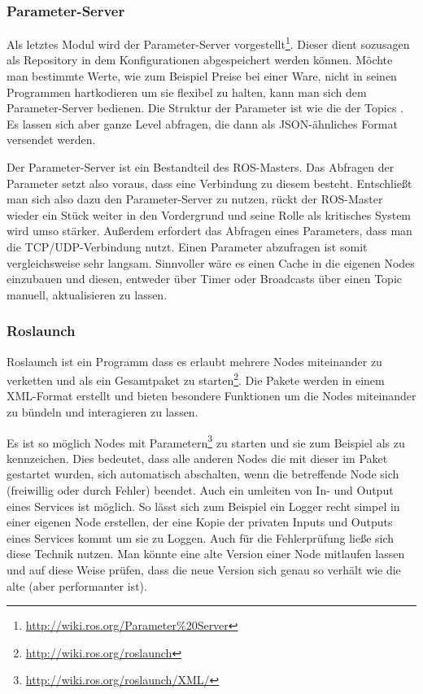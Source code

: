 \subsubsection*{Parameter-Server}
Als letztes Modul wird der Parameter-Server vorgestellt\footnote{\url{http://wiki.ros.org/Parameter\%20Server}}. Dieser dient sozusagen als Repository in dem Konfigurationen abgespeichert werden können. Möchte man bestimmte Werte, wie zum Beispiel Preise bei einer Ware, nicht in seinen Programmen hartkodieren um sie flexibel zu halten, kann man sich dem Parameter-Server bedienen. Die Struktur der Parameter ist wie die der Topics . Es lassen sich aber ganze Level abfragen, die dann als JSON-ähnliches Format versendet werden.

Der Parameter-Server ist ein Bestandteil des ROS-Masters. Das Abfragen der Parameter setzt also voraus, dass eine Verbindung zu diesem besteht. Entschließt man sich also dazu den Parameter-Server zu nutzen, rückt der ROS-Master wieder ein Stück weiter in den Vordergrund und seine Rolle als kritisches System wird umso stärker. Außerdem erfordert das Abfragen eines Parameters, dass man die TCP/UDP-Verbindung nutzt. Einen Parameter abzufragen ist somit vergleichsweise sehr langsam. Sinnvoller wäre es einen Cache in die eigenen Nodes einzubauen und diesen, entweder über Timer oder Broadcasts über einen Topic manuell, aktualisieren zu lassen.

\subsubsection*{Roslaunch}
Roslaunch ist ein Programm dass es erlaubt mehrere Nodes miteinander zu verketten und als ein Gesamtpaket zu starten\footnote{\url{http://wiki.ros.org/roslaunch}}. Die Pakete werden in einem XML-Format erstellt und bieten besondere Funktionen um die Nodes miteinander zu bündeln und interagieren zu lassen.

Es ist so möglich Nodes mit Parametern\footnote{\url{http://wiki.ros.org/roslaunch/XML/}} zu starten und sie zum Beispiel als  zu kennzeichen. Dies bedeutet, dass alle anderen Nodes die mit dieser im Paket gestartet wurden, sich automatisch abschalten, wenn die betreffende Node sich (freiwillig oder durch Fehler) beendet.
Auch ein umleiten von In- und Output eines Services ist möglich. So lässt sich zum Beispiel ein Logger recht simpel in einer eigenen Node erstellen, der eine Kopie der privaten Inputs und Outputs eines Services kommt um sie zu Loggen. Auch für die Fehlerprüfung ließe sich diese Technik nutzen. Man könnte eine alte Version einer Node mitlaufen lassen und auf diese Weise prüfen, dass die neue Version sich genau so verhält wie die alte (aber performanter ist).

